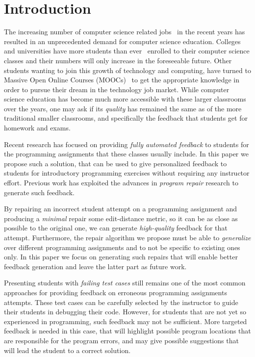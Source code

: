\section{Introduction}
\label{sec:intro}

The increasing number of computer science related
jobs~\citep[][]{compsci-demand} in the recent years has resulted in an
unprecedented demand for computer science education. Colleges and universities
have more students than ever~\citep[][]{compsci-classes} enrolled to their
computer science classes and their numbers will only increase in the foreseeable
future. Other students wanting to join this growth of technology and computing,
have turned to Massive Open Online Courses (MOOCs)~\citep[][]{moocs} to get the
appropriate knowledge in order to pursue their dream in the technology job
market. While computer science education has become much more accessible with
these larger classrooms over the years, one may ask if its \emph{quality} has
remained the same as of the more traditional smaller classrooms, and
specifically the feedback that students get for homework and exams.

Recent research has focused on providing \emph{fully automated feedback} to
students for the programming assignments that these classes usually include. In
this paper we propose such a solution, that can be used to give personalized
feedback to students for introductory programming exercises without requiring
any instructor effort. Previous work has exploited the advances in \emph{program
repair} research to generate such feedback.

By repairing an incorrect student attempt on a programming assignment and
producing a \emph{minimal} repair \wrt some edit-distance metric, so it can be
as close as possible to the original one, we can generate \emph{high-quality}
feedback for that attempt. Furthermore, the repair algorithm we propose must be
able to \emph{generalize} over different programming assignments and to not be
specific to existing ones only. In this paper we focus on generating such
repairs that will enable better feedback generation and leave the latter part as
future work.

Presenting students with \emph{failing test cases} still remains one of the most
common approaches for providing feedback on erroneous programming assignments
attempts. These test cases can be carefully selected by the instructor to guide
their students in debugging their code. However, for students that are not yet
so experienced in programming, such feedback may not be sufficient. More
targeted feedback is needed in this case, that will highlight possible program
locations that are responsible for the program errors, and may give possible
suggestions that will lead the student to a correct solution.

